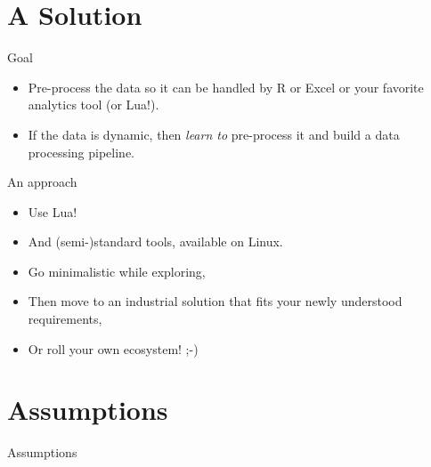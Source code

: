 \documentclass[handout]{beamer}
\begin{document}

\section{A Solution}


\begin{frame}{Goal}

\begin{itemize}
\item Pre-process the data so it can be handled by R or Excel or your favorite
analytics tool (or Lua!).
\item If the data is dynamic, then \textit{learn to} pre-process it
      and build a data processing pipeline.
\end{itemize}

\end{frame}


\begin{frame}{An approach}

\begin{itemize}
\item Use Lua!
\item And (semi-)standard tools, available on Linux.
\item Go minimalistic while exploring,
\item Then move to an industrial solution that fits your newly understood
      requirements,
\item Or roll your own ecosystem! ;-)
\end{itemize}

\end{frame}


\section{Assumptions}


\begin{frame}
\huge Assumptions
\end{frame}
\end{document}
